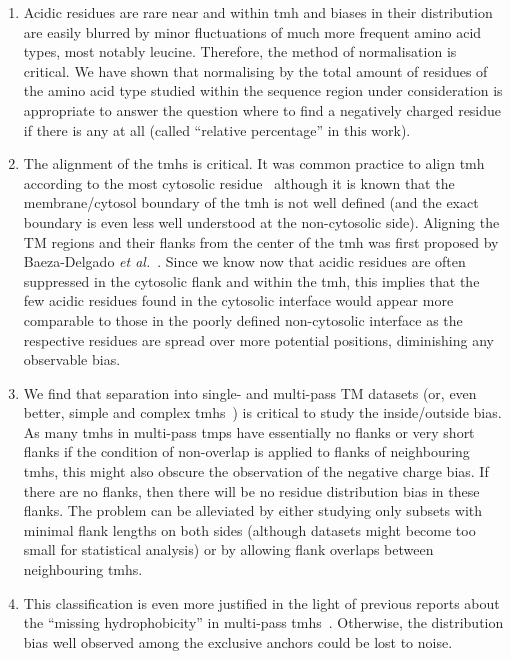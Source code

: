 \begin{enumerate}[i]
  \item Acidic residues are rare near and within \gls{tmh} and biases in their distribution are easily blurred by minor fluctuations of much more frequent amino acid types, most notably leucine.
Therefore, the method of normalisation is critical.
We have shown that normalising by the total amount of residues of the amino acid type studied within the sequence region under consideration is appropriate to answer the question where to find a negatively charged residue if there is any at all (called ``relative percentage'' in this work).
  \item The alignment of the \gls{tmh}s is critical.
It was common practice to align \gls{tmh} according to the most cytosolic residue~\cite{Sharpe2010} although it is known that the membrane/cytosol boundary of the \gls{tmh} is not well defined (and the exact boundary is even less well understood at the non-cytosolic side).
Aligning the TM regions and their flanks from the center of the \gls{tmh} was first proposed by Baeza-Delgado \textit{et al.}~\cite{Baeza-Delgado2013}.
Since we know now that acidic residues are often suppressed in the cytosolic flank and within the \gls{tmh}, this implies that the few acidic residues found in the cytosolic interface would appear more comparable to those in the poorly defined non-cytosolic interface as the respective residues are spread over more potential positions, diminishing any observable bias.
  \item We find that separation into single- and multi-pass TM datasets (or, even better, simple and complex \gls{tmh}s~\cite{Wong2011, Wong2012}) is critical to study the inside/outside bias.
As many \gls{tmh}s in multi-pass \gls{tmp}s have essentially no flanks or very short flanks if the condition of non-overlap is applied to flanks of neighbouring \gls{tmh}s, this might also obscure the observation of the negative charge bias.
If there are no flanks, then there will be no residue distribution bias in these flanks.
The problem can be alleviated by either studying only subsets with minimal flank lengths on both sides (although datasets might become too small for statistical analysis) or by allowing flank overlaps between neighbouring \gls{tmh}s.
  \item This classification is even more justified in the light of previous reports about the ``missing hydrophobicity'' in multi-pass \gls{tmh}s~\cite{Nilsson1990, Hedin2010, Hessa2007, Ojemalm2012}.
Otherwise, the distribution bias well observed among the exclusive anchors could be lost to noise.

\end{enumerate}
